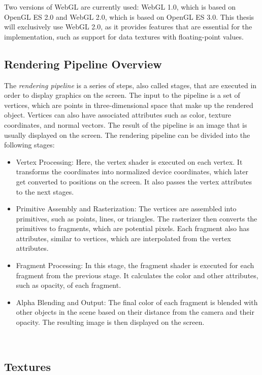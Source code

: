 Two versions of WebGL are currently used: WebGL 1.0, which is based on OpenGL ES 2.0 and WebGL 2.0, which is based on OpenGL ES 3.0. This thesis will exclusively use WebGL 2.0, as it provides features that are essential for the implementation, such as support for data textures with floating-point values.\ \cite{webgl:2fundamentals}

\subsection{Rendering Pipeline Overview}

The \emph{rendering pipeline} is a series of steps, also called stages, that are executed in order to display graphics on the screen. The input to the pipeline is a set of vertices, which are points in three-dimensional space that make up the rendered object. Vertices can also have associated attributes such as color, texture coordinates, and normal vectors. The result of the pipeline is an image that is usually displayed on the screen. The rendering pipeline can be divided into the following stages:

\begin{itemize}
    \item Vertex Processing: Here, the vertex shader is executed on each vertex. It transforms the coordinates into normalized device coordinates, which later get converted to positions on the screen. It also passes the vertex attributes to the next stages.
    \item Primitive Assembly and Rasterization: The vertices are assembled into primitives, such as points, lines, or triangles. The rasterizer then converts the primitives to fragments, which are potential pixels. Each fragment also has attributes, similar to vertices, which are interpolated from the vertex attributes.
    \item Fragment Processing: In this stage, the fragment shader is executed for each fragment from the previous stage. It calculates the color and other attributes, such as opacity, of each fragment.
    \item Alpha Blending and Output: The final color of each fragment is blended with other objects in the scene based on their distance from the camera and their opacity. The resulting image is then displayed on the screen.
\end{itemize}

\ \cite{opengl:book}

\subsection{Textures}

